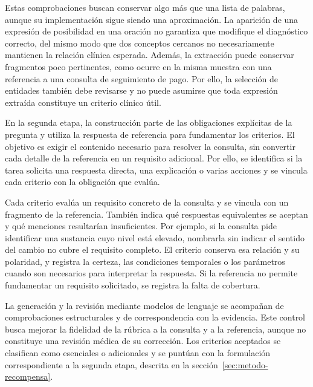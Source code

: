 Estas comprobaciones buscan conservar algo más que una lista de palabras, aunque su implementación sigue siendo una aproximación. La aparición de una expresión de posibilidad en una oración no garantiza que modifique el diagnóstico correcto, del mismo modo que dos conceptos cercanos no necesariamente mantienen la relación clínica esperada. Además, la extracción puede conservar fragmentos poco pertinentes, como ocurre en la misma muestra con una referencia a una consulta de seguimiento de pago. Por ello, la selección de entidades también debe revisarse y no puede asumirse que toda expresión extraída constituye un criterio clínico útil.


En la segunda etapa, la construcción parte de las obligaciones explícitas de la pregunta y utiliza la respuesta de referencia para fundamentar los criterios. El objetivo es exigir el contenido necesario para resolver la consulta, sin convertir cada detalle de la referencia en un requisito adicional. Por ello, se identifica si la tarea solicita una respuesta directa, una explicación o varias acciones y se vincula cada criterio con la obligación que evalúa.

Cada criterio evalúa un requisito concreto de la consulta y se vincula con un fragmento de la referencia. También indica qué respuestas equivalentes se aceptan y qué menciones resultarían insuficientes. Por ejemplo, si la consulta pide identificar una sustancia cuyo nivel está elevado, nombrarla sin indicar el sentido del cambio no cubre el requisito completo. El criterio conserva esa relación y su polaridad, y registra la certeza, las condiciones temporales o los parámetros cuando son necesarios para interpretar la respuesta. Si la referencia no permite fundamentar un requisito solicitado, se registra la falta de cobertura.

La generación y la revisión mediante modelos de lenguaje se acompañan de comprobaciones estructurales y de correspondencia con la evidencia. Este control busca mejorar la fidelidad de la rúbrica a la consulta y a la referencia, aunque no constituye una revisión médica de su corrección. Los criterios aceptados se clasifican como esenciales o adicionales y se puntúan con la formulación correspondiente a la segunda etapa, descrita en la sección~\ref{sec:metodo-recompensa}.
